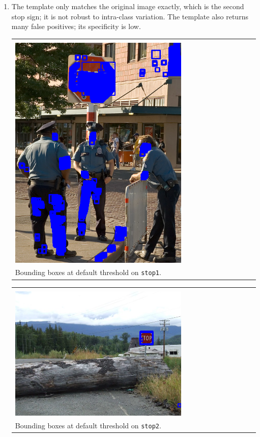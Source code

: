 \documentclass{article}
\begin{document}
\begin{enumerate}[label=(\roman*)]
\pagebreak

\item %
The template only matches the original image exactly, which is the second stop sign; it is not robust to intra-class variation. The template also returns many false positives; its specificity is low.

\begin{tabular}[t]{l}
	\hline \\
	\includegraphics[width=0.7\textwidth]{img/stop1_detection.png} \\
	Bounding boxes at default threshold on \texttt{stop1}. \\
	\hline
\end{tabular}

\begin{tabular}[t]{l}
	\hline \\
	\includegraphics[width=0.7\textwidth]{img/stop2_detection.png} \\
	Bounding boxes at default threshold on \texttt{stop2}. \\
	\hline
\end{tabular}


\end{enumerate}
\end{document}
